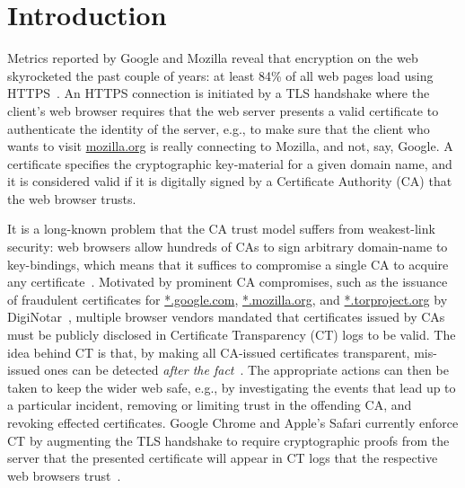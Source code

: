 \section{Introduction} \label{sec:introduction}
Metrics reported by Google and Mozilla reveal that encryption on the web
skyrocketed the past couple of years: at least 84\% of all web pages load using
HTTPS~\cite{google-metrics,mozilla-metrics}. An HTTPS connection is initiated by
a TLS handshake where the client's web browser requires that the web server
presents a valid certificate to authenticate the identity of the server, e.g.,
to make sure that the client who wants to visit \url{mozilla.org} is really
connecting to Mozilla, and not, say, Google. A certificate specifies the
cryptographic key-material for a given domain name, and it is considered valid
if it is digitally signed by a Certificate Authority (CA) that the web browser
trusts.

It is a long-known problem that the CA trust model suffers from
weakest-link security:
	web browsers allow hundreds of CAs to sign arbitrary domain-name to
		key-bindings,
	which means that it suffices to compromise a single CA to acquire any
		certificate~\cite{ca-ecosystem,https-sok}.
Motivated by prominent CA compromises, such as the issuance of fraudulent
certificates for
	\url{*.google.com},
	\url{*.mozilla.org}, and
	\url{*.torproject.org}
by DigiNotar~\cite{diginotar}, multiple browser vendors mandated
that certificates issued by CAs must be publicly disclosed in Certificate
Transparency (CT) logs to be valid.  The idea behind CT is that, by making all
CA-issued certificates transparent, mis-issued ones can be detected
\emph{after the fact}~\cite{ct/a,ct,ct/bis}.  The appropriate actions can then
be taken to keep the wider web safe, e.g., by
	investigating the events that lead up to a particular incident,
	removing or limiting trust in the offending CA, and
	revoking effected certificates.
Google Chrome and Apple's Safari currently enforce CT by augmenting the TLS
handshake to require cryptographic proofs from the server that the presented
certificate will appear in CT logs that the respective web browsers
trust~\cite{chrome-policy,safari-policy}.

